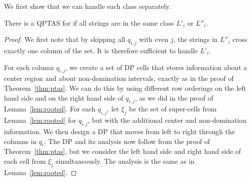 We first show that we can handle each class separately.
\begin{lemma}\label{lem:half-length-class}
    There is a QPTAS for \GMEC if all strings are in the same class $L'_i$ or $L''_i$.
\end{lemma}
\begin{proof}
    We first note that by skipping all $q_{i,j}$ with even $j$, the strings in $L''_i$ cross exactly one column of the set.
    It is therefore sufficient to handle $L'_i$.
    
    For each column $q_{i,j}$, we create a set of DP cells that stores information about a center region and about non-domination intervals, exactly as in the proof of Theorem~\ref{thm:ptas}. 
    We can do this by using different row orderings on the left hand side and on the right hand side of $q_{i,j}$, as we did in the proof of Lemma~\ref{lem:rooted}.
    For each $q_{i,j}$, let $\xi_j$ be the set of super-cells from Lemma~\ref{lem:rooted} for $q_{i,j}$, but with the additional center and non-domination information.
    We then design a DP that moves from left to right through the columns in $q_i$.
    The DP and its analysis now follow from the proof of Theorem~\ref{thm:ptas}, but we consider the left hand side and right hand side of each cell from $\xi_j$ simultaneously.
    The analysis is the same as in Lemma~\ref{lem:rooted}.
\end{proof}

